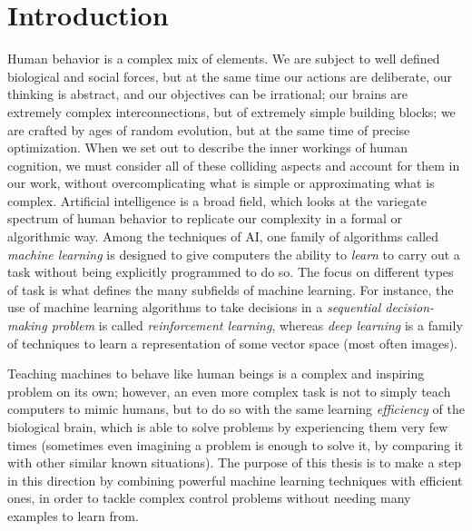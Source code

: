 \chapter{Introduction}
\label{ch1_intro}
\thispagestyle{empty}

\vspace{0.5cm}
 
Human behavior is a complex mix of elements. We are subject to 
well defined biological and social forces, but at the same time our actions are 
deliberate, our thinking is abstract, and our objectives can be irrational; 
our brains are extremely complex interconnections, but of extremely simple 
building blocks; we are crafted by ages of random evolution, but at the same 
time of precise optimization. 
When we set out to describe the inner workings of human cognition, we must 
consider all of these colliding aspects and account for them in our work, 
without overcomplicating what is simple or approximating what is complex.
Artificial intelligence is a broad field, which looks at the variegate spectrum 
of human behavior to replicate our complexity in a formal or algorithmic way. 
Among the techniques of AI, one family of algorithms called \textit{machine
learning} is designed to give computers the ability to \textit{learn} to carry 
out a task without being explicitly programmed to do so. 
The focus on different types of task is what defines the many subfields of 
machine learning.
For instance, the use of machine learning algorithms to take decisions in a 
\textit{sequential decision-making problem} is called \textit{reinforcement 
learning}, whereas \textit{deep learning} is a family of techniques to learn a 
representation of some vector space (most often images).

Teaching machines to behave like human beings is a complex and inspiring problem
on its own; however, an even more complex task is not to simply teach 
computers to mimic humans, but to do so with the same learning 
\textit{efficiency} of the biological brain, which is able to solve problems by
experiencing them very few times (sometimes even imagining a problem is enough 
to solve it, by comparing it with other similar known situations). 
The purpose of this thesis is to make a step in this direction by
combining powerful machine learning techniques with efficient ones, in order
to tackle complex control problems without needing many examples to learn
from.

